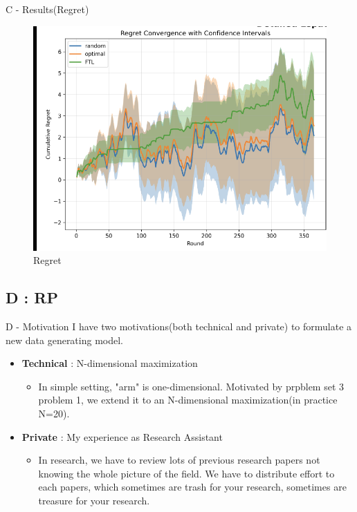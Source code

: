 \documentclass{beamer}
\begin{document}
\begin{frame}{C - Results(Regret)}
\begin{figure}
    \centering
    \includegraphics[width=0.5\linewidth]{332Project2//figures/Regret.png}
    \caption{Regret}
    \label{fig:placeholder}
\end{figure}
    
\end{frame}


\subsection{D : RP}

\begin{frame}{D - Motivation}
I have two motivations(both technical and private) to formulate a new data generating model.
    \begin{itemize}
        \item \textbf{Technical} : N-dimensional maximization
        \begin{itemize}
            \item In simple setting, "arm" is one-dimensional. Motivated by prpblem set 3 problem 1, we extend it to an N-dimensional maximization(in practice N=20).
        \end{itemize}
        \item \textbf{Private} : My experience as Research Assistant
        \begin{itemize}
            \item In research, we have to review lots of previous research papers not knowing the whole picture of the field. We have to distribute effort to each papers, which sometimes are trash for your research, sometimes are treasure for your research.
        \end{itemize}
    \end{itemize}
\end{frame}
\end{document}
